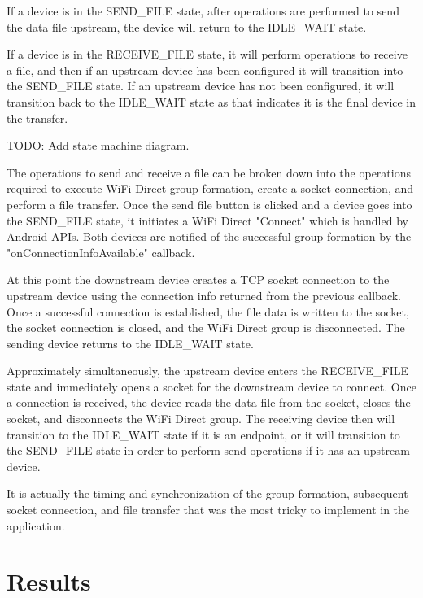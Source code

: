 \documentclass[10pt,twocolumn]{article}
\begin{document}
If a device is in the SEND\_FILE state, after operations are performed to send the data file upstream, the device will return to the IDLE\_WAIT state.

If a device is in the RECEIVE\_FILE state, it will perform operations to receive a file, and then if an upstream device has been configured it will transition into the SEND\_FILE state.
If an upstream device has not been configured, it will transition back to the IDLE\_WAIT state as that indicates it is the final device in the transfer.

TODO: Add state machine diagram.  

The operations to send and receive a file can be broken down into the operations required to execute WiFi Direct group formation, create a socket connection, and perform a file transfer. 
Once the send file button is clicked and a device goes into the SEND\_FILE state, it initiates a WiFi Direct "Connect" which is handled by Android APIs.
Both devices are notified of the successful group formation by the "onConnectionInfoAvailable" callback.

At this point the downstream device creates a TCP socket connection to the upstream device using the connection info returned from the previous callback.
Once a successful connection is established, the file data is written to the socket, the socket connection is closed, and the WiFi Direct group is disconnected.
The sending device returns to the IDLE\_WAIT state.

Approximately simultaneously, the upstream device enters the RECEIVE\_FILE state and immediately opens a socket for the downstream device to connect.
Once a connection is received, the device reads the data file from the socket, closes the socket, and disconnects the WiFi Direct group.
The receiving device then will transition to the IDLE\_WAIT state if it is an endpoint, or it will transition to the SEND\_FILE state in order to perform send operations if it has an upstream device.

It is actually the timing and synchronization of the group formation, subsequent socket connection, and file transfer that was the most tricky to implement in the application.

\section{Results}
\end{document}
